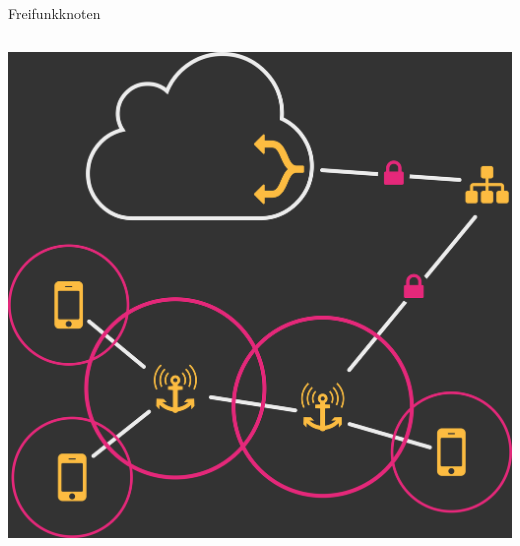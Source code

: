 \documentclass[t,aspectratio=169]{beamer}
\begin{document}
\begin{frame}{Freifunkknoten}
\begin{columns}
\begin{column}{0.4\textwidth}
\begin{center}
          \includegraphics[width=\textwidth]{netz-klein}
        \end{center}
      \end{column}
    \end{columns}
  \end{frame}
  
\end{document}
